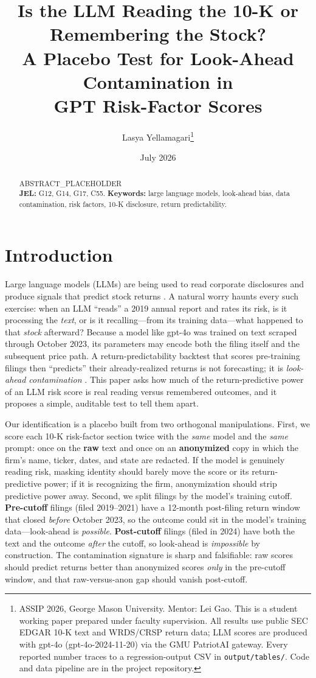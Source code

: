 \documentclass[12pt]{article}
\title{\textbf{Is the LLM Reading the 10-K or Remembering the Stock?\\
A Placebo Test for Look-Ahead Contamination in\\
GPT Risk-Factor Scores}}
\author{Lasya Yellamagari\thanks{ASSIP 2026, George Mason University. Mentor: Lei Gao.
This is a student working paper prepared under faculty supervision. All results use
public SEC EDGAR 10-K text and WRDS/CRSP return data; LLM scores are produced with
gpt-4o (gpt-4o-2024-11-20) via the GMU PatriotAI gateway. Every reported number traces to
a regression-output CSV in \texttt{output/tables/}. Code and data pipeline are in the
project repository.}}
\date{July 2026}
\begin{document}
\maketitle

\begin{abstract}
\noindent %
ABSTRACT_PLACEHOLDER
\\[4pt]
\noindent\textbf{JEL:} G12, G14, G17, C55. \quad
\textbf{Keywords:} large language models, look-ahead bias, data contamination, risk
factors, 10-K disclosure, return predictability.
\end{abstract}

\section{Introduction}
Large language models (LLMs) are being used to read corporate disclosures and produce
signals that predict stock returns \citep{lopezlira2023,kim2024,jha2024}. A natural worry
haunts every such exercise: when an LLM ``reads'' a 2019 annual report and rates its risk,
is it processing the \emph{text}, or is it recalling---from its training data---what
happened to that \emph{stock} afterward? Because a model like gpt-4o was trained on text
scraped through October 2023, its parameters may encode both the filing itself and the
subsequent price path. A return-predictability backtest that scores pre-training filings
then ``predicts'' their already-realized returns is not forecasting; it is
\emph{look-ahead contamination} \citep{glasserman2023,sarkar2024}. This paper asks how much
of the return-predictive power of an LLM risk score is real reading versus remembered
outcomes, and it proposes a simple, auditable test to tell them apart.

Our identification is a placebo built from two orthogonal manipulations. First, we score
each 10-K risk-factor section twice with the \emph{same} model and the \emph{same} prompt:
once on the \textbf{raw} text and once on an \textbf{anonymized} copy in which the firm's
name, ticker, dates, and state are redacted. If the model is genuinely reading risk, masking
identity should barely move the score or its return-predictive power; if it is recognizing
the firm, anonymization should strip predictive power away. Second, we split filings by the
model's training cutoff. \textbf{Pre-cutoff} filings (filed 2019--2021) have a 12-month
post-filing return window that closed \emph{before} October 2023, so the outcome could sit
in the model's training data---look-ahead is \emph{possible}. \textbf{Post-cutoff} filings
(filed in 2024) have both the text and the outcome \emph{after} the cutoff, so look-ahead is
\emph{impossible} by construction. The contamination signature is sharp and falsifiable: raw
scores should predict returns better than anonymized scores \emph{only} in the pre-cutoff
window, and that raw-versus-anon gap should vanish post-cutoff.
\end{document}
